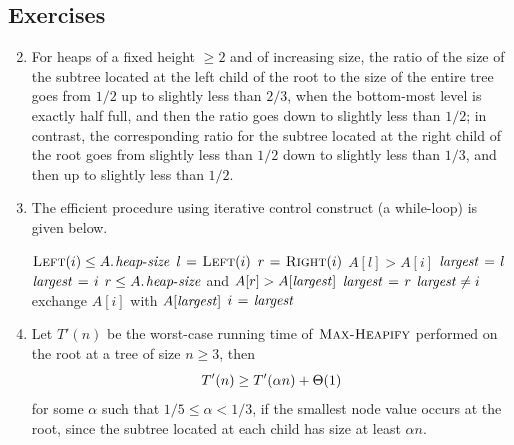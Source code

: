 \subsection*{Exercises}
\begin{enumerate}[\thesection-1]
%
\setcounter{enumi}{1}
%
\item For heaps of a fixed height $\geq 2$ and of increasing size, the ratio of the size of the subtree located at the left child of the root to the size of the entire tree goes from $1/2$ up to slightly less than $2/3$, when the bottom-most level is exactly half full, and then the ratio goes down to slightly less than $1/2$; in contrast, the corresponding ratio for the subtree located at the right child of the root goes from slightly less than $1/2$ down to slightly less than $1/3$, and then up to slightly less than $1/2$.
%
\setcounter{enumi}{5}
%
\item The efficient procedure using iterative control construct (a while-loop) is given below.
\begin{codebox}
\li \While $\proc{Left}(i) \leq \attrib{A}{heap-size}$
\li        \Do
               $l \mathrel{\hspace{1pt}=\hspace{1pt}} \textnormal{\scshape Left}(i)$
\li            $r \mathrel{\hspace{1pt}=\hspace{1pt}} \textnormal{\scshape Right}(i)$
\li            \If $A[l] > A[i]$
\li                \Then
                         $\id{largest} \gets l$
\li                \Else
                         $\id{largest} \gets i$
               \End
\li            \If $r \leq \attrib{A}{heap-size}$ and $A[r] > A[\id{largest}]$
\li                \Then
                         $\id{largest} \gets r$
               \End
\li            \If $\id{largest} \neq i$
\li                \Then
                         exchange $A[i]$ with $A[\id{largest}]$
\li                      $i \gets \id{largest}$
               \End
           \End
\end{codebox}
%
\item Let $T'(n)$ be the worst-case running time of $\textnormal{\scshape Max-Heapify}$ performed on the root at a tree of size $n \geq 3$, then
\[
T'(n) \geq T'(\alpha n) + \Theta\!\left(1\right)
\]
for some $\alpha$ such that $1/5 \leq \alpha < 1/3$, if the smallest node value occurs at the root, since the subtree located at each child has size at least $\alpha n$.
%
\end{enumerate}


